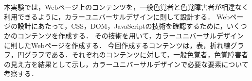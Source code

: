 \section{\purpose}
本実験では，Webページ上のコンテンツを，一般色覚者と色覚障害者が相違なく利用できるように，カラーユニバーサルデザインに則して設計する．
Webページの設計にあたって，CSS，DOM，JavaScriptの技術を確認するために，いくつかのコンテンツを作成する．
その技術を用いて，カラーユニバーサルデザインに則したWebページを作成する．
今回作成するコンテンツは，表，折れ線グラフ，円グラフである．それぞれのコンテンツに対して，一般色覚者，色覚障害者の見え方を結果として示し，カラーユニバーサルデザインで必要な要素について考察する．
